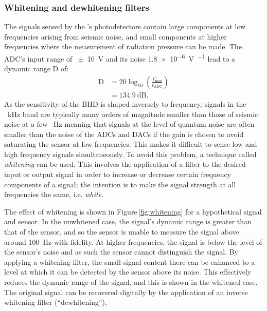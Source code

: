 \subsubsection{\label{sec:whitening-dewhitening}Whitening and dewhitening filters}
The signals sensed by the \SSMEXPT{}'s photodetectors contain large components at low frequencies arising from seismic noise, and small components at higher frequencies where the measurement of radiation pressure can be made. The \gls{ADC}'s input range of \SI{\pm10}{\volt} and its noise \SI{1.8e-6}{\volt\per\sqrthz} lead to a dynamic range $\text{D}$ of:
\begin{equation}
  \begin{split}
    \text{D} &= 20 \log_{10} \left( \frac{V_{\text{max}}}{\epsilon_{\text{ADC}}} \right) \\
             &= \SI{134.9}{\deci\bel}.
  \end{split}
\end{equation}
As the sensitivity of the \gls{BHD} is shaped inversely to frequency, signals in the \SI{}{\kilo\hertz} band are typically many orders of magnitude smaller than those of seismic noise at a few \SI{}{\hertz} meaning that signals at the level of quantum noise are often smaller than the noise of the \glspl{ADC} and \glspl{DAC} if the gain is chosen to avoid saturating the sensor at low frequencies. This makes it difficult to sense low and high frequency signals simultaneously. To avoid this problem, a technique called \emph{whitening} can be used. This involves the application of a filter to the desired input or output signal in order to increase or decrease certain frequency components of a signal; the intention is to make the signal strength at all frequencies the same, i.e. \emph{white}.

The effect of whitening is shown in Figure\,\ref{fig:whitening} for a hypothetical signal and sensor. In the unwhitened case, the signal's dynamic range is greater than that of the sensor, and so the sensor is unable to measure the signal above around \SI{100}{\hertz} with fidelity. At higher frequencies, the signal is below the level of the sensor's noise and as such the sensor cannot distinguish the signal. By applying a whitening filter, the small signal content there can be enhanced to a level at which it can be detected by the sensor above its noise. This effectively reduces the dynamic range of the signal, and this is shown in the whitened case. The original signal can be recovered digitally by the application of an inverse whitening filter (``dewhitening'').

